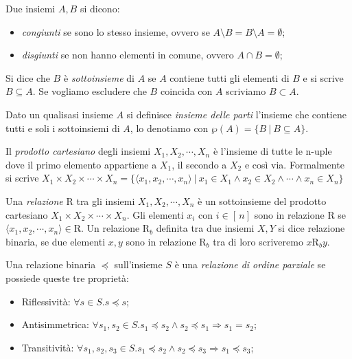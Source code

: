 \begin{definition}
Due insiemi \(A, B\) si dicono:
\begin{itemize}
    \item \textit{congiunti} se sono lo stesso insieme, ovvero se \(A\setminus B=B\setminus A=\emptyset\);
    \item \textit{disgiunti}  se non hanno elementi in comune, ovvero \(A\cap B=\emptyset\);
\end{itemize}
Si dice che \(B\) è \textit{sottoinsieme} di \(A\) se \(A\) contiene tutti gli elementi di \(B\) e si scrive \(B\subseteq A\). Se vogliamo escludere che \(B\) coincida con \(A\) scriviamo \(B\subset A\). 
\end{definition}

\begin{definition}
Dato un qualisasi insieme \(A\) si definisce \textit{insieme delle parti} l'insieme che contiene tutti e soli i sottoinsiemi di \(A\), lo denotiamo con \(\wp(A)=\{B\ |\ B\subseteq A\}\).
\end{definition}

\begin{definition}
Il \textit{prodotto cartesiano} degli insiemi \(X_1,X_2,\cdots,X_n\) è l'insieme di tutte le n-uple dove il primo elemento appartiene a \(X_1\), il secondo a \(X_2\) e così via. Formalmente si scrive \(X_1\times X_2\times\cdots\times X_n=\{\langle x_1, x_2,\cdots, x_n\rangle\ |\ x_1\in X_1\wedge x_2\in X_2\wedge\cdots\wedge x_n\in X_n\}\)
\end{definition}

\begin{definition}[Relazione]
Una \textit{relazione} R tra gli insiemi \(X_1,X_2,\cdots,X_n\) è un sottoinsieme del prodotto cartesiano \(X_1\times X_2\times\cdots\times X_n\). Gli elementi \(x_i\) con \(i\in [\, n]\) sono in relazione R se \(\langle x_1, x_2,\cdots, x_n\rangle\in\textrm{R}\). Un relazione \(\textrm{R}_b\) definita tra due insiemi \(X, Y\) si dice relazione binaria, se due elementi \(x, y\) sono in relazione \(\textrm{R}_b\) tra di loro scriveremo \(x\textrm{R}_b y\).
\end{definition}

\begin{definition}
Una relazione binaria \(\preceq\) sull'insieme \(S\) è una \textit{relazione di ordine parziale} se possiede queste tre proprietà:
\begin{itemize}
\item Riflessività: \(\forall s\in S. s\preceq s\);
\item Antisimmetrica: \(\forall s_1, s_2\in S. s_1\preceq s_2 \wedge s_2\preceq s_1 \Rightarrow s_1=s_2\);
\item Transitività: \(\forall s_1, s_2, s_3 \in S. s_1\preceq s_2 \wedge s_2\preceq s_3 \Rightarrow s_1\preceq s_3\);
\end{itemize}
\end{definition}

